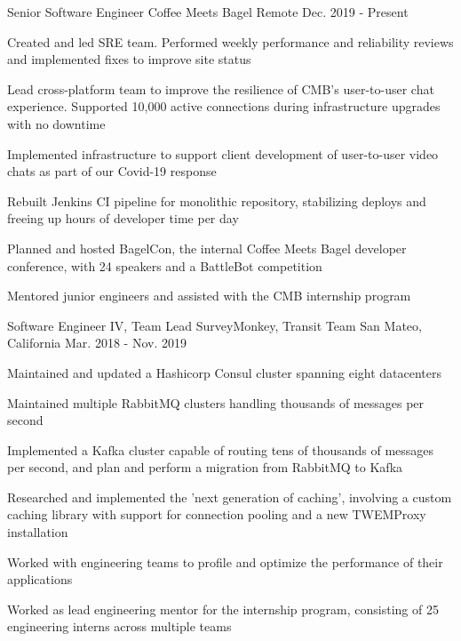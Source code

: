 \begin{cventries}
  \cventry
    {Senior Software Engineer}
    {Coffee Meets Bagel}
    {Remote}
    {Dec. 2019 - Present}
    {
        \begin{cvitems}
          \item {Created and led SRE team. Performed weekly performance and reliability reviews and implemented fixes to improve site status}
          \item {Lead cross-platform team to improve the resilience of CMB's user-to-user chat experience. Supported 10,000 active connections during infrastructure upgrades with no downtime}
          \item {Implemented infrastructure to support client development of user-to-user video chats as part of our Covid-19 response}
          \item {Rebuilt Jenkins CI pipeline for monolithic repository, stabilizing deploys and freeing up hours of developer time per day}
          \item {Planned and hosted BagelCon, the internal Coffee Meets Bagel developer conference, with 24 speakers and a BattleBot competition}
          \item {Mentored junior engineers and assisted with the CMB internship program}
        \end{cvitems}
    }
  \cventry
    {Software Engineer IV, Team Lead}
    {SurveyMonkey, Transit Team}
    {San Mateo, California}
    {Mar. 2018 - Nov. 2019}
    {
      \begin{cvitems}
        \item {Maintained and updated a Hashicorp Consul cluster spanning eight datacenters}
        \item {Maintained multiple RabbitMQ clusters handling thousands of messages per second}
        \item {Implemented a Kafka cluster capable of routing tens of thousands of messages per second, and plan and perform a migration from RabbitMQ to Kafka}
        \item {Researched and implemented the 'next generation of caching', involving a custom caching library with support for connection pooling and a new TWEMProxy installation}
        \item {Worked with engineering teams to profile and optimize the performance of their applications}
        \item {Worked as lead engineering mentor for the internship program, consisting of 25 engineering interns across multiple teams}

\end{cvitems}}
\end{cventries}
